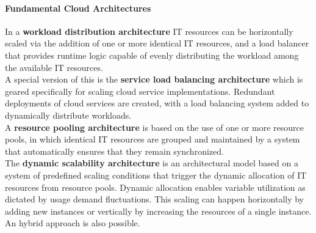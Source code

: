 \paragraph{Fundamental Cloud Architectures}
In a \textbf{workload distribution architecture} IT resources can be horizontally scaled via the addition of one or more identical IT resources, and a load balancer that provides runtime logic capable of evenly distributing the workload among the available IT resources.\\

A special version of this is the \textbf{service load balancing architecture} which is geared specifically for scaling cloud service implementations.
Redundant deployments of cloud services are created, with a load balancing system added to dynamically distribute workloads.\\

A \textbf{resource pooling architecture} is based on the use of one or more resource pools, in which identical IT resources are grouped and maintained by a system that automatically ensures that they remain synchronized.\\

The \textbf{dynamic scalability architecture} is an architectural model based on a system of predefined scaling conditions that trigger the dynamic allocation of IT resources from resource pools.
Dynamic allocation enables variable utilization as dictated by usage demand fluctuations.
This scaling can happen horizontally by adding new instances or vertically by increasing the resources of a single instance.
An hybrid approach is also possible.\\
